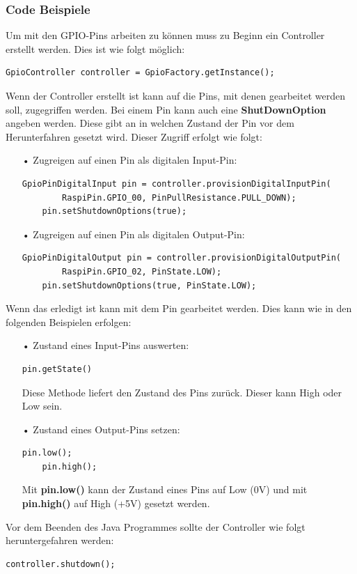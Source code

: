 \subsubsection{Code Beispiele}
Um mit den GPIO-Pins arbeiten zu können muss zu Beginn ein Controller erstellt werden. Dies ist wie folgt möglich:
\begin{lstlisting}[style=JavaStyle]
	GpioController controller = GpioFactory.getInstance();
\end{lstlisting}
Wenn der Controller erstellt ist kann auf die Pins, mit denen gearbeitet werden soll, zugegriffen werden. Bei einem Pin kann auch eine \textbf{ShutDownOption} angeben werden. Diese gibt an in welchen Zustand der Pin vor dem Herunterfahren gesetzt wird. Dieser Zugriff erfolgt wie folgt: 
\begin{itemize}
\item[•] Zugreigen auf einen Pin als digitalen Input-Pin:
\begin{lstlisting}[style=JavaStyle]
	GpioPinDigitalInput pin = controller.provisionDigitalInputPin(
		RaspiPin.GPIO_00, PinPullResistance.PULL_DOWN);
	pin.setShutdownOptions(true);
\end{lstlisting}
\item[•] Zugreigen auf einen Pin als digitalen Output-Pin:
\begin{lstlisting}[style=JavaStyle]
	GpioPinDigitalOutput pin = controller.provisionDigitalOutputPin(
		RaspiPin.GPIO_02, PinState.LOW);
	pin.setShutdownOptions(true, PinState.LOW);
\end{lstlisting}
\end{itemize}
Wenn das erledigt ist kann mit dem Pin gearbeitet werden. Dies kann wie in den folgenden Beispielen erfolgen:
\begin{itemize}
\item[•] Zustand eines Input-Pins auswerten: 
\begin{lstlisting}[style=JavaStyle]
	pin.getState()
\end{lstlisting}
Diese Methode liefert den Zustand des Pins zurück. Dieser kann High oder Low sein.
\item[•] Zustand eines Output-Pins setzen:
\begin{lstlisting}[style=JavaStyle]
	pin.low();	
	pin.high();
\end{lstlisting}
Mit \textbf{pin.low()} kann der Zustand eines Pins auf Low (0V) und mit \textbf{pin.high()} auf High (+5V) gesetzt werden. 
\end{itemize}

Vor dem Beenden des Java Programmes sollte der Controller wie folgt heruntergefahren werden:
\begin{lstlisting}[style=JavaStyle]
	controller.shutdown();
\end{lstlisting}

